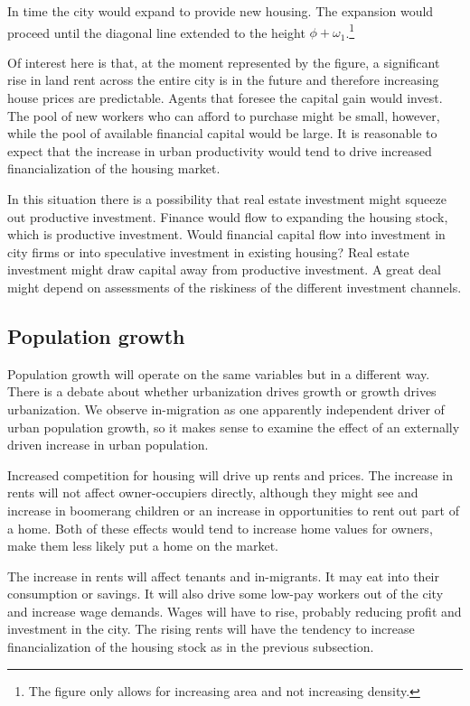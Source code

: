 In time the city would expand to provide new housing. The expansion would proceed until the diagonal line extended to the height $\phi+\omega_1$.\footnote{The figure only allows for increasing area and not increasing density.}  

Of interest here is that, at the moment represented by the figure, a significant rise in land rent across the entire city is in the future and therefore increasing house prices are predictable. Agents that foresee the capital gain would invest. The pool of new workers who can afford to purchase might be small, however, while the pool of available financial capital would be large. It is reasonable to expect that the increase in urban productivity would tend to drive increased financialization of the housing market.

In this situation there is a possibility that real estate investment might squeeze out productive investment. Finance would flow to expanding the housing stock, which is productive investment.  Would financial capital flow into investment in city firms or into speculative investment in existing housing? Real estate investment might  draw capital away from productive investment. A great deal might depend on assessments of the riskiness of the different investment channels.

\subsection{Population growth}
Population growth will operate on the same variables  but in a different way. There is a debate about whether urbanization drives  growth or growth drives urbanization. We observe in-migration as one apparently independent driver of urban population growth,  so it makes sense to examine the effect of an externally driven increase in urban population. 

Increased competition for housing will drive up rents and prices. The increase in rents will not affect owner-occupiers directly, although they might see and increase in boomerang children or an increase in opportunities to rent out part of a home. Both of these effects would tend to increase home values for owners, make them less likely put a home on the market. 

The increase in rents will affect tenants and in-migrants. It may eat into their consumption or savings. It will also drive some low-pay workers out of the city and increase wage demands. Wages will have to rise, probably reducing profit and investment in the city. The rising rents will have the tendency to increase financialization of the housing stock as in the previous subsection.


